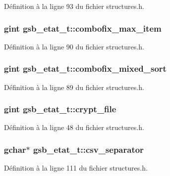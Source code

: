 Définition à la ligne 93 du fichier structures.h.

\subsubsection[{combofix\_\-max\_\-item}]{\setlength{\rightskip}{0pt plus 5cm}gint {\bf gsb\_\-etat\_\-t::combofix\_\-max\_\-item}}\label{structgsb__etat__t_a6a71e36dd4154a8a28ec1c61815e48cf}


Définition à la ligne 90 du fichier structures.h.

\subsubsection[{combofix\_\-mixed\_\-sort}]{\setlength{\rightskip}{0pt plus 5cm}gint {\bf gsb\_\-etat\_\-t::combofix\_\-mixed\_\-sort}}\label{structgsb__etat__t_a66bb2fbaf6417db78f4a3444aa26cfa3}


Définition à la ligne 89 du fichier structures.h.

\subsubsection[{crypt\_\-file}]{\setlength{\rightskip}{0pt plus 5cm}gint {\bf gsb\_\-etat\_\-t::crypt\_\-file}}\label{structgsb__etat__t_a5d00886877a537e1acf2ca7eb8d247f6}


Définition à la ligne 48 du fichier structures.h.

\subsubsection[{csv\_\-separator}]{\setlength{\rightskip}{0pt plus 5cm}gchar$\ast$ {\bf gsb\_\-etat\_\-t::csv\_\-separator}}\label{structgsb__etat__t_a21a448909a9460d5a6de8ddf4edb16e0}


Définition à la ligne 111 du fichier structures.h.

